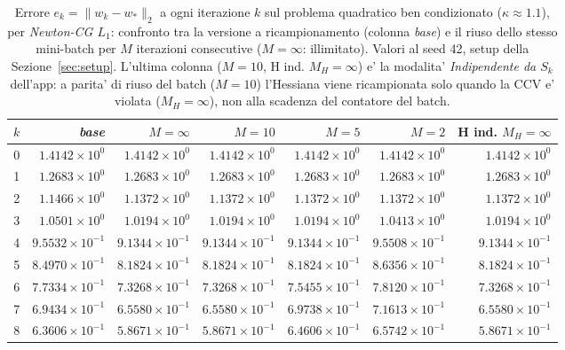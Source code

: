 \begin{table}[H]
\centering
\footnotesize
\renewcommand{\arraystretch}{0.85}
\setlength{\tabcolsep}{2pt}
\caption{Errore $e_k=\|w_k-w_*\|_2$ a ogni iterazione $k$ sul problema quadratico ben condizionato ($\kappa\approx 1.1$), per \emph{Newton-CG $L_1$}: confronto tra la versione a ricampionamento (colonna \emph{base}) e il riuso dello stesso mini-batch per $M$ iterazioni consecutive ($M=\infty$: illimitato). Valori al seed 42, setup della Sezione~\ref{sec:setup}. L'ultima colonna ($M{=}10$, H ind. $M_H{=}\infty$) e' la modalita' \emph{Indipendente da $S_k$} dell'app: a parita' di riuso del batch ($M=10$) l'Hessiana viene ricampionata solo quando la CCV e' violata ($M_H=\infty$), non alla scadenza del contatore del batch.}
\label{tab:riuso_bencond_l1}
\begin{tabular}{@{}rrrrrrr@{}}
\toprule
$k$ & \emph{base} & $M{=}\infty$ & $M{=}10$ & $M{=}5$ & $M{=}2$ & H ind. $M_H{=}\infty$\\
\midrule
0 & $1.4142\times10^{0}$ & $1.4142\times10^{0}$ & $1.4142\times10^{0}$ & $1.4142\times10^{0}$ & $1.4142\times10^{0}$ & $1.4142\times10^{0}$\\
1 & $1.2683\times10^{0}$ & $1.2683\times10^{0}$ & $1.2683\times10^{0}$ & $1.2683\times10^{0}$ & $1.2683\times10^{0}$ & $1.2683\times10^{0}$\\
2 & $1.1466\times10^{0}$ & $1.1372\times10^{0}$ & $1.1372\times10^{0}$ & $1.1372\times10^{0}$ & $1.1372\times10^{0}$ & $1.1372\times10^{0}$\\
3 & $1.0501\times10^{0}$ & $1.0194\times10^{0}$ & $1.0194\times10^{0}$ & $1.0194\times10^{0}$ & $1.0413\times10^{0}$ & $1.0194\times10^{0}$\\
4 & $9.5532\times10^{-1}$ & $9.1344\times10^{-1}$ & $9.1344\times10^{-1}$ & $9.1344\times10^{-1}$ & $9.5508\times10^{-1}$ & $9.1344\times10^{-1}$\\
5 & $8.4970\times10^{-1}$ & $8.1824\times10^{-1}$ & $8.1824\times10^{-1}$ & $8.1824\times10^{-1}$ & $8.6356\times10^{-1}$ & $8.1824\times10^{-1}$\\
6 & $7.7334\times10^{-1}$ & $7.3268\times10^{-1}$ & $7.3268\times10^{-1}$ & $7.5455\times10^{-1}$ & $7.8120\times10^{-1}$ & $7.3268\times10^{-1}$\\
7 & $6.9434\times10^{-1}$ & $6.5580\times10^{-1}$ & $6.5580\times10^{-1}$ & $6.9738\times10^{-1}$ & $7.1613\times10^{-1}$ & $6.5580\times10^{-1}$\\
8 & $6.3606\times10^{-1}$ & $5.8671\times10^{-1}$ & $5.8671\times10^{-1}$ & $6.4606\times10^{-1}$ & $6.5742\times10^{-1}$ & $5.8671\times10^{-1}$\\

\end{tabular}
\end{table}
